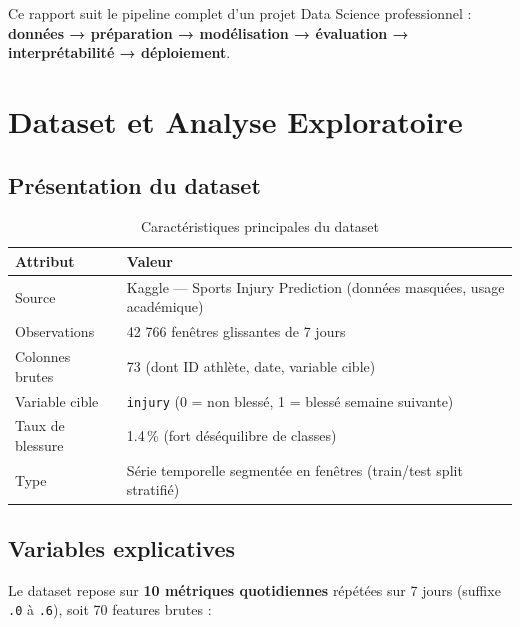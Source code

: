 \documentclass[12pt,a4paper]{report}
\begin{document}
Ce rapport suit le pipeline complet d'un projet Data Science professionnel :
\textbf{données → préparation → modélisation → évaluation → interprétabilité → déploiement}.

\chapter{Dataset et Analyse Exploratoire}

\section{Présentation du dataset}

\begin{table}[H]
\centering
\begin{tabularx}{\textwidth}{lX}
\toprule
\textbf{Attribut} & \textbf{Valeur} \\
\midrule
Source & Kaggle — Sports Injury Prediction (données masquées, usage académique) \\
Observations & 42 766 fenêtres glissantes de 7 jours \\
Colonnes brutes & 73 (dont ID athlète, date, variable cible) \\
Variable cible & \texttt{injury} (0 = non blessé, 1 = blessé semaine suivante) \\
Taux de blessure & 1.4\,\% (fort déséquilibre de classes) \\
Type & Série temporelle segmentée en fenêtres (train/test split stratifié) \\
\bottomrule
\end{tabularx}
\caption{Caractéristiques principales du dataset}
\end{table}

\section{Variables explicatives}

Le dataset repose sur \textbf{10 métriques quotidiennes} répétées sur 7 jours (suffixe \texttt{.0}
à \texttt{.6}), soit 70 features brutes :
\end{document}
